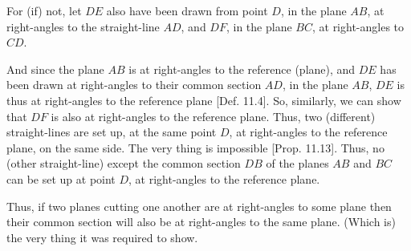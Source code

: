 \begin{Parallel}{}{}
{For (if) not, let $DE$ also have been drawn from point $D$,  in the plane
$AB$, at right-angles to the straight-line $AD$, and $DF$, in the plane $BC$, at right-angles to $CD$.

And since the plane $AB$ is at right-angles to the reference (plane),
and $DE$ has been drawn at right-angles to their common section $AD$,
in the plane $AB$, $DE$ is thus at right-angles to the reference 
plane [Def. 11.4]. So, similarly, we can show that
$DF$ is also at right-angles to the reference plane. Thus, two (different) straight-lines
are set up, at the same point $D$, at right-angles to the reference plane,
on the same side. The very thing is impossible [Prop. 11.13]. Thus, no (other straight-line) except the common section
$DB$ of the planes $AB$ and $BC$ can be set up at point $D$,
at right-angles to the reference plane.

Thus, if two planes cutting one another are at right-angles to some plane then their common section will also be at right-angles to the
same plane. (Which is) the very thing it was required to show.}
\end{Parallel}

